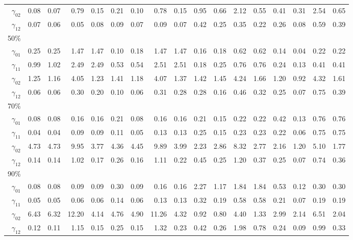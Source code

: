 \documentclass[12pt]{article}
\begin{document}
\begin{table}
\begin{tabular}{r|rrrr|rrrr|rrrr|rrrr}
$\gamma_{02}$ & 0.08 & 0.07 & 0.79 & 0.15 & 0.21 & 0.10 & 0.78 & 0.15 & 0.95 & 0.66 & 2.12 & 0.55 & 0.41 & 0.31 & 2.54 & 0.65 \\
$\gamma_{12}$ & 0.07 & 0.06 & 0.05 & 0.08 & 0.09 & 0.07 & 0.09 & 0.07 & 0.42 & 0.25 & 0.35 & 0.22 & 0.26 & 0.08 & 0.59 & 0.39 \\
50\% &&&&&&&&&&&&&&&\\
$\gamma_{01}$ & 0.25 & 0.25 & 1.47 & 1.47 & 0.10 & 0.18 & 1.47 & 1.47 & 0.16 & 0.18 & 0.62 & 0.62 & 0.14 & 0.04 & 0.22 & 0.22 \\
$\gamma_{11}$  & 0.99 & 1.02 & 2.49 & 2.49 & 0.53 & 0.54 & 2.51 & 2.51 & 0.18 & 0.25 & 0.76 & 0.76 & 0.24 & 0.13 & 0.41 & 0.41 \\
$\gamma_{02}$  & 1.25 & 1.16 & 4.05 & 1.23 & 1.41 & 1.18 & 4.07 & 1.37 & 1.42 & 1.45 & 4.24 & 1.66 & 1.20 & 0.92 & 4.32 & 1.61 \\
$\gamma_{12}$  & 0.06 & 0.06 & 0.30 & 0.20 & 0.10 & 0.06 & 0.31 & 0.28 & 0.28 & 0.16 & 0.46 & 0.32 & 0.25 & 0.07 & 0.75 & 0.39 \\
70\% &&&&&&&&&&&&&&&\\
$\gamma_{01}$  & 0.08 & 0.08 & 0.16 & 0.16 & 0.21 & 0.08 & 0.16 & 0.16 & 0.21 & 0.15 & 0.22 & 0.22 & 0.42 & 0.13 & 0.76 & 0.76 \\
$\gamma_{11}$  & 0.04 & 0.04 & 0.09 & 0.09 & 0.11 & 0.05 & 0.13 & 0.13 & 0.25 & 0.15 & 0.23 & 0.23 & 0.22 & 0.06 & 0.75 & 0.75 \\
$\gamma_{02}$  & 4.73 & 4.73 & 9.95 & 3.77 & 4.36 & 4.45 & 9.89 & 3.99 & 2.23 & 2.86 & 8.32 & 2.77 & 2.16 & 1.20 & 5.10 & 1.77 \\
$\gamma_{12}$  & 0.14 & 0.14 & 1.02 & 0.17 & 0.26 & 0.16 & 1.11 & 0.22 & 0.45 & 0.25 & 1.20 & 0.37 & 0.25 & 0.07 & 0.74 & 0.36 \\
90\% &&&&&&&&&&&&&&&\\
$\gamma_{01}$  & 0.08 & 0.08 & 0.09 & 0.09 & 0.30 & 0.09 & 0.16 & 0.16 & 2.27 & 1.17 & 1.84 & 1.84 & 0.53 & 0.12 & 0.30 & 0.30 \\
$\gamma_{11}$  & 0.05 & 0.05 & 0.06 & 0.06 & 0.14 & 0.06 & 0.13 & 0.13 & 0.32 & 0.19 & 0.58 & 0.58 & 0.21 & 0.07 & 0.19 & 0.19 \\
$\gamma_{02}$  & 6.43 & 6.32 & 12.20 & 4.14 & 4.76 & 4.90 & 11.26 & 4.32 & 0.92 & 0.80 & 4.40 & 1.33 & 2.99 & 2.14 & 6.51 & 2.04 \\
$\gamma_{12}$  & 0.12 & 0.11 & 1.15 & 0.15 & 0.25 & 0.15 & 1.32 & 0.23 & 0.42 & 0.26 & 1.98 & 0.78 & 0.24 & 0.09 & 0.99 & 0.33 \\
\hline
  \end{tabular}

\end{table}
\end{document}
